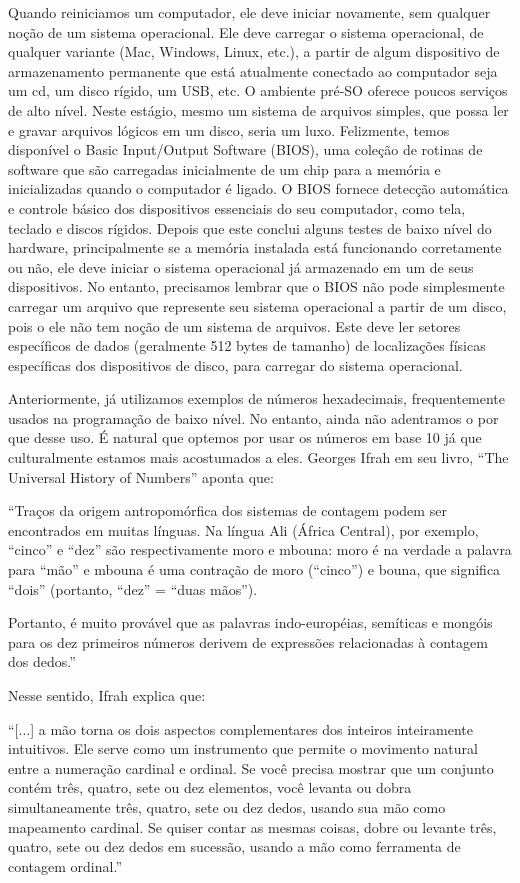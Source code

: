 Quando reiniciamos um computador, ele deve iniciar novamente, sem qualquer noção de um sistema operacional. Ele deve carregar o sistema operacional, de qualquer variante (Mac, Windows, Linux, etc.), a partir de algum dispositivo de armazenamento permanente que está atualmente conectado ao computador seja um cd, um disco rígido, um USB, etc. O ambiente pré-SO oferece poucos serviços de alto nível. Neste estágio, mesmo um sistema de arquivos simples, que possa ler e gravar arquivos lógicos em um disco, seria um luxo. Felizmente, temos disponível o Basic Input/Output Software (BIOS), uma coleção de rotinas de software que são carregadas inicialmente de um chip para a memória e inicializadas quando o computador é ligado. O BIOS fornece detecção automática e controle básico dos dispositivos essenciais do seu computador, como tela, teclado e discos rígidos. Depois que este conclui alguns testes de baixo nível do hardware, principalmente se a memória instalada está funcionando corretamente ou não, ele deve iniciar o sistema operacional já armazenado em um de seus dispositivos. No entanto, precisamos lembrar que o BIOS não pode simplesmente carregar um arquivo que represente seu sistema operacional a partir de um disco, pois o ele não tem noção de um sistema de arquivos. Este deve ler setores específicos de dados (geralmente 512 bytes de tamanho) de localizações físicas específicas dos dispositivos de disco, para carregar do sistema operacional.

Anteriormente, já utilizamos exemplos de números hexadecimais, frequentemente usados na programação de baixo nível. No entanto, ainda não adentramos o por que desse uso. É natural que optemos por usar os números em base 10 já que culturalmente estamos mais acostumados a eles. Georges Ifrah em seu livro, ``The Universal History of Numbers''\cite{14} aponta que:

``Traços da origem antropomórfica dos sistemas de contagem podem ser encontrados em muitas línguas. Na língua Ali (África Central), por exemplo, ``cinco'' e ``dez'' são respectivamente moro e mbouna: moro é na verdade a palavra para ``mão'' e mbouna é uma contração de moro (``cinco'') e bouna, que significa ``dois'' (portanto, ``dez'' = ``duas mãos'').

Portanto, é muito provável que as palavras indo-européias, semíticas e mongóis para os dez primeiros números derivem de expressões relacionadas à contagem dos dedos.''

Nesse sentido, Ifrah explica que:

``[...] a mão torna os dois aspectos complementares dos inteiros inteiramente intuitivos. Ele serve como um instrumento que permite o movimento natural entre a numeração cardinal e ordinal. Se você precisa mostrar que um conjunto contém três, quatro, sete ou dez elementos, você levanta ou dobra simultaneamente três, quatro, sete ou dez dedos, usando sua mão como mapeamento cardinal. Se quiser contar as mesmas coisas, dobre ou levante três, quatro, sete ou dez dedos em sucessão, usando a mão como ferramenta de contagem ordinal.''

